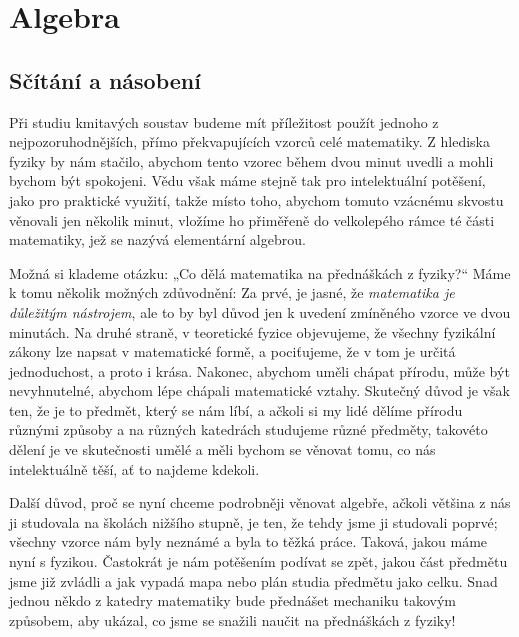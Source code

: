 \setchaptertoc
\chapter{Algebra}\label{fyz:IchapXXII}
  \section{Sčítání a násobení}\label{fyz:IchapXXIIsecI}
    Při studiu kmitavých soustav budeme mít příležitost použít jednoho z nejpozoruhodnějších, přímo
    překvapujících vzorců celé matematiky. Z hlediska fyziky by nám stačilo, abychom tento vzorec
    během dvou minut uvedli a mohli bychom být spokojeni. Vědu však máme stejně tak pro
    intelektuální potěšení, jako pro praktické využití, takže místo toho, abychom tomuto vzácnému
    skvostu věnovali jen několik minut, vložíme ho přiměřeně do velkolepého rámce té části
    matematiky, jež se nazývá elementární algebrou.
    
    Možná si klademe otázku: „Co dělá matematika na přednáškách z fyziky?“ Máme k tomu několik
    možných zdůvodnění: Za prvé, je jasné, že \emph{matematika je důležitým nástrojem}, ale to by
    byl důvod jen k uvedení zmíněného vzorce ve dvou minutách. Na druhé straně, v teoretické fyzice
    objevujeme, že všechny fyzikální zákony lze napsat v matematické formě, a pociťujeme, že v tom
    je určitá jednoduchost, a proto i krása. Nakonec, abychom uměli chápat přírodu, může být
    nevyhnutelné, abychom lépe chápali matematické vztahy. Skutečný důvod je však ten, že je to
    předmět, který se nám líbí, a ačkoli si my lidé dělíme přírodu různými způsoby a na různých
    katedrách studujeme různé předměty, takovéto dělení je ve skutečnosti umělé a měli bychom se
    věnovat tomu, co nás intelektuálně těší, ať to najdeme kdekoli.
    
    Další důvod, proč se nyní chceme podrobněji věnovat algebře, ačkoli většina z nás ji studovala
    na školách nižšího stupně, je ten, že tehdy jsme ji studovali poprvé; všechny vzorce nám byly
    neznámé a byla to těžká práce. Taková, jakou máme nyní s fyzikou. Častokrát je nám potěšením
    podívat se zpět, jakou část předmětu jsme již zvládli a jak vypadá mapa nebo plán studia
    předmětu jako celku. Snad jednou někdo z katedry matematiky bude přednášet mechaniku takovým
    způsobem, aby ukázal, co jsme se snažili naučit na přednáškách z fyziky!
    
